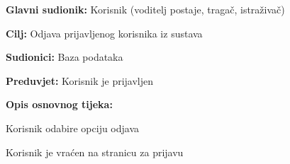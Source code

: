 
					\noindent {}
					\begin{packed_item}
	
						\item \textbf{Glavni sudionik: }  Korisnik (voditelj postaje, tragač, istraživač)
						\item  \textbf{Cilj:} Odjava prijavljenog korisnika iz sustava
						\item  \textbf{Sudionici:} Baza podataka
						\item  \textbf{Preduvjet:} Korisnik je prijavljen
						\item  \textbf{Opis osnovnog tijeka:} 
						
						
						\item[] \begin{packed_enum}
	
							\item Korisnik odabire opciju odjava							
							\item Korisnik je vraćen na stranicu za prijavu
						
						\end{packed_enum}
				
							
					\end{packed_item}


